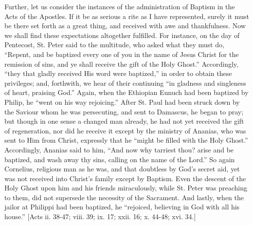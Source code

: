 Further, let us consider the instances of the administration of
Baptism in the Acts of the Apostles. If it be as serious a rite as I
have represented, surely it must be there set forth as a great thing,
and received with awe and thankfulness. Now we shall find these
expectations altogether fulfilled. For instance, on the day of
Pentecost, St. Peter said to the multitude, who asked what they must
do, ``Repent, and be baptized every one of you in the name of
Jesus Christ for the remission of sins, and ye shall receive the gift
of the Holy Ghost.'' Accordingly, ``they that gladly received
His word were baptized,'' in order to obtain these privileges;
and, forthwith, we hear of their continuing ``in gladness and
singleness of heart, praising God.'' Again, when the Ethiopian
Eunuch had been baptized by Philip, he ``went on his way
rejoicing.'' After St. Paul had been struck down by the Saviour
whom he was persecuting, and sent to Damascus, he began to pray; but
though in one sense a changed man already, he had not yet received the
gift of regeneration, nor did he receive it except by the ministry of
Ananias, who was sent to Him from Christ, expressly that he
``might be filled with the Holy Ghost.'' Accordingly, Ananias
said to him, ``And now why tarriest thou? arise and be baptized,
and wash away thy sins, calling on the name of the Lord.'' So
again Cornelius, religious man as he was, and that doubtless by God's
secret aid, yet was not received into Christ's family except by
Baptism. Even the descent of the Holy Ghost upon him and his friends
miraculously, while St. Peter was preaching to them, did not supersede
the necessity of the Sacrament. And lastly, when the jailor at
Philippi had been baptized, he ``rejoiced, believing in God with
all his house.'' [Acts ii. 38-47; viii. 39; ix. 17; xxii. 16; x.
44-48; xvi. 34.]

